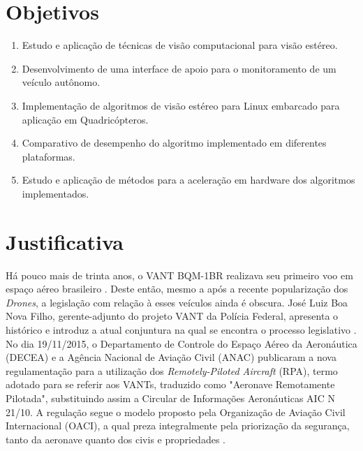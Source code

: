 \section{Objetivos}
\label{objetivos}

\begin{enumerate}
	\item Estudo e aplicação de técnicas de visão computacional para visão estéreo.
	\item Desenvolvimento de uma interface de apoio para o monitoramento de um veículo autônomo.
	\item Implementação de algoritmos de visão estéreo para Linux embarcado para aplicação em Quadricópteros.
	\item Comparativo de desempenho do algoritmo implementado em diferentes plataformas.
	\item Estudo e aplicação de métodos para a aceleração em hardware dos algoritmos implementados.
\end{enumerate}


\section{Justificativa}

Há pouco mais de trinta anos, o VANT BQM-1BR realizava seu primeiro voo em espaço aéreo brasileiro \cite{Magno2009}. Deste então, mesmo a após a recente popularização dos \textit{Drones}, a legislação com relação à esses veículos ainda é obscura. José Luiz Boa Nova Filho, gerente-adjunto do projeto VANT da Polícia Federal, apresenta o histórico e introduz a atual conjuntura na qual se encontra o processo legislativo \cite{Filho2014}. No dia 19/11/2015, o Departamento de Controle do Espaço Aéreo da Aeronáutica (DECEA) e a Agência Nacional de Aviação Civil (ANAC) publicaram a nova regulamentação para a utilização dos \textit{Remotely-Piloted Aircraft} (RPA), termo adotado para se referir aos VANTs, traduzido como "Aeronave Remotamente Pilotada", substituindo assim a Circular de Informações Aeronáuticas AIC N 21/10. A regulação segue o modelo proposto pela Organização de Aviação Civil Internacional (OACI), a qual preza integralmente pela priorização da segurança, tanto da aeronave quanto dos civis e propriedades \cite{DECEA2015}. 

